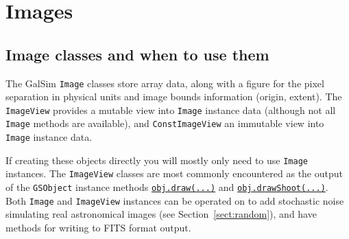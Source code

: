 \documentclass[preprint,11pt]{aastex}
\begin{document}
\section{Images}\label{sect:image}

\subsection{Image classes and when to use them}
The GalSim \texttt{Image} classes store array data, along with a
figure for the pixel separation in physical units and image bounds
information (origin, extent).  The \texttt{ImageView} provides a
mutable view into \texttt{Image} instance data (although not all
\texttt{Image} methods are available), and
\texttt{ConstImageView} an immutable view into \texttt{Image} instance
data.

If creating these objects directly you will mostly only need to use
\texttt{Image} instances.  The \texttt{ImageView} classes are most
commonly encountered as the output of the \texttt{GSObject} instance
methods
\href{http://galsim-developers.github.com/GalSim/classgalsim_1_1base_1_1_g_s_object.html#ae0b346a8b438dedbc7f60a52220869d8}{\texttt{obj.draw(...)}}
and
\href{http://galsim-developers.github.com/GalSim/classgalsim_1_1base_1_1_g_s_object.html#a42ac334d2840ba3fa832988e998beca0}{\texttt{obj.drawShoot(...)}}.
Both \texttt{Image} and \texttt{ImageView} instances can be operated
on to add stochastic noise simulating real astronomical images (see
Section~\ref{sect:random}), and have methods for writing to FITS
format output.
\end{document}
